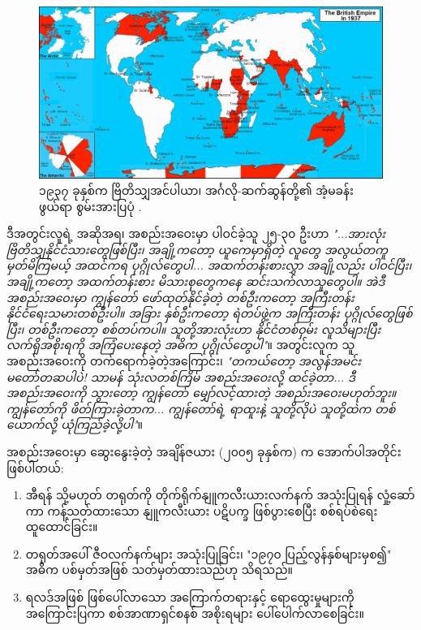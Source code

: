 \documentclass[10pt,twocolumn,letterpaper]{article}
\begin{document}
\begin{figure}[t]
\begin{center}
\includegraphics[width=1\textwidth]{british.jpg}
\end{center}
   \caption{၁၉၃၇ ခုနှစ်က ဗြိတိသျှအင်ပါယာ၊ အင်္ဂလို-ဆက်ဆွန်တို့၏ အံ့မခန်းဖွယ်ရာ စွမ်းအားပြပုံ \cite{14}.}
   \label{fig:2}
\end{figure}
ဒီအတွင်းလူရဲ့ အဆိုအရ၊ အစည်းအဝေးမှာ ပါဝင်ခဲ့သူ ၂၅-၃၀ ဦးဟာ \textit{"...အားလုံးဗြိတိသျှနိုင်ငံသားတွေဖြစ်ပြီး၊ အချို့ကတော့ ယူကေမှာရှိတဲ့ လူတွေ အလွယ်တကူ မှတ်မိကြမယ့် အထင်ကရ ပုဂ္ဂိုလ်တွေပါ... အထက်တန်းစားလွှာ အချို့လည်း ပါဝင်ပြီး၊ အချို့ကတော့ အထက်တန်းစား မိသားစုတွေကနေ ဆင်းသက်လာသူတွေပါ။ အဲဒီအစည်းအဝေးမှာ ကျွန်တော် ဖော်ထုတ်နိုင်ခဲ့တဲ့ တစ်ဦးကတော့ အကြီးတန်း နိုင်ငံရေးသမားတစ်ဦးပါ။ အခြား နှစ်ဦးကတော့ ရဲတပ်ဖွဲ့က အကြီးတန်း ပုဂ္ဂိုလ်တွေဖြစ်ပြီး၊ တစ်ဦးကတော့ စစ်တပ်ကပါ။ သူတို့အားလုံးဟာ နိုင်ငံတစ်ဝှမ်း လူသိများပြီး လက်ရှိအစိုးရကို အကြံပေးနေတဲ့ အဓိက ပုဂ္ဂိုလ်တွေပါ"}\cite{4}။ အတွင်းလူက သူအစည်းအဝေးကို တက်ရောက်ခဲ့တဲ့အကြောင်း၊ \textit{"တကယ်တော့ အလွန်အမင်း မတော်တဆပါပဲ! သာမန် သုံးလတစ်ကြိမ် အစည်းအဝေးလို့ ထင်ခဲ့တာ... ဒီအစည်းအဝေးကို သွားတော့ ကျွန်တော် မျှော်လင့်ထားတဲ့ အစည်းအဝေးမဟုတ်ဘူး။ ကျွန်တော်ကို ဖိတ်ကြားခဲ့တာက... ကျွန်တော်ရဲ့ ရာထူးနဲ့ သူတို့လိုပဲ သူတို့ထဲက တစ်ယောက်လို့ ယုံကြည်ခဲ့လို့ပါ"}\cite{4}။

အစည်းအဝေးမှာ ဆွေးနွေးခဲ့တဲ့ အချိန်ဇယား (၂၀၀၅ ခုနှစ်က) က အောက်ပါအတိုင်းဖြစ်ပါတယ်:

\begin{flushleft}
\begin{enumerate}
    \item အီရန် သို့မဟုတ် တရုတ်ကို တိုက်ရိုက်နျူကလီးယားလက်နက် အသုံးပြုရန် လှုံ့ဆော်ကာ ကန့်သတ်ထားသော နျူကလီးယား ပဋိပက္ခ ဖြစ်ပွားစေပြီး စစ်ရပ်စဲရေး ထူထောင်ခြင်း။
    \item တရုတ်အပေါ် ဇီဝလက်နက်များ အသုံးပြုခြင်း၊ "၁၉၇၀ ပြည့်လွန်နှစ်များမှစ၍" အဓိက ပစ်မှတ်အဖြစ် သတ်မှတ်ထားသည်ဟု သိရသည်။
    \item ရလဒ်အဖြစ် ဖြစ်ပေါ်လာသော အကြောက်တရားနှင့် ရောထွေးမှုများကို အကြောင်းပြကာ စစ်အာဏာရှင်စနစ် အစိုးရများ ပေါ်ပေါက်လာစေခြင်း။
\end{enumerate}
\end{flushleft}
\end{document}

